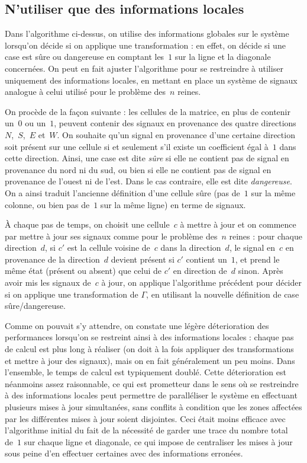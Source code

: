 \subsection{N'utiliser que des informations locales}

Dans l'algorithme ci-dessus, on utilise des informations globales sur le système lorsqu'on décide si on applique une transformation : en effet, on décide si une case est sûre ou dangereuse en comptant les~$1$ sur la ligne et la diagonale concernées. On peut en fait ajuster l'algorithme pour se restreindre à utiliser uniquement des informations locales, en mettant en place un système de signaux analogue à celui utilisé pour le problème des~$n$ reines. 

On procède de la façon suivante : les cellules de la matrice, en plus de contenir un~$0$ ou un~$1$, peuvent contenir des signaux en provenance des quatre directions~$N$,~$S$,~$E$ et~$W$. On souhaite qu'un signal en provenance d'une certaine direction soit présent sur une cellule si et seulement s'il existe un coefficient égal à~$1$ dans cette direction. Ainsi, une case est dite \emph{sûre} si elle ne contient pas de signal en provenance du nord ni du sud, ou bien si elle ne contient pas de signal en provenance de l'ouest ni de l'est. Dans le cas contraire, elle est dite \emph{dangereuse}. On a ainsi traduit l'ancienne définition d'une cellule sûre (pas de~$1$ sur la même colonne, ou bien pas de~$1$ sur la même ligne) en terme de signaux.

À chaque pas de temps, on choisit une cellule~$c$ à mettre à jour et on commence par mettre à jour ses signaux comme pour le problème des~$n$ reines : pour chaque direction~$d$, si $c'$ est la cellule voisine de~$c$ dans la direction~$d$, le signal en~$c$ en provenance de la direction~$d$ devient présent si $c'$ contient un~$1$, et prend le même état (présent ou absent) que celui de $c'$ en direction de~$d$ sinon.
Après avoir mis les signaux de~$c$ à jour, on applique l'algorithme précédent pour décider si on applique une transformation de $\Gamma$, en utilisant la nouvelle définition de case sûre/dangereuse. 

Comme on pouvait s'y attendre, on constate une légère déterioration des performances lorsqu'on se restreint ainsi à des informations locales : chaque pas de calcul est plus long à réaliser (on doit à la fois appliquer des transformations et mettre à jour des signaux), mais on en fait généralement un peu moins. Dans l'ensemble, le temps de calcul est typiquement doublé. Cette déterioration est néanmoins assez raisonnable, ce qui est prometteur dans le sens où se restreindre à des informations locales peut permettre de paralléliser le système en effectuant plusieurs mises à jour simultanées, sans conflits à condition que les zones affectées par les différentes mises à jour soient disjointes. Ceci était moins efficace avec l'algorithme initial du fait de la nécessité de garder une trace du nombre total de~$1$ sur chaque ligne et diagonale, ce qui impose de centraliser les mises à jour sous peine d'en effectuer certaines avec des informations erronées.

